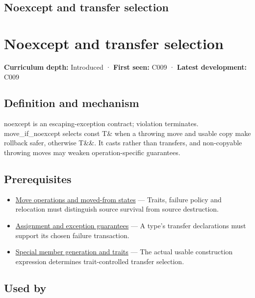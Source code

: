\hypertarget{appendix-c746afaa47d1}{}
\section*{Noexcept and transfer selection}
\chapter{Noexcept and transfer selection}\label{appendix-c746afaa47d1-noexcept-and-transfer-selection}

\textbf{Curriculum depth:} Introduced · \textbf{First seen:} C009 · \textbf{Latest development:} C009

\section{Definition and mechanism}\label{appendix-c746afaa47d1-definition-and-mechanism}

noexcept is an escaping-exception contract; violation terminates. move\_if\_noexcept selects const T\& when a throwing move and usable copy make rollback safer, otherwise T\&\&. It casts rather than transfers, and non-copyable throwing moves may weaken operation-specific guarantees.

\section{Prerequisites}\label{appendix-c746afaa47d1-prerequisites}

\begin{itemize}
\tightlist
\item
  \hyperref[appendix-5636651017c2]{Move operations and moved-from states} --- Traits, failure policy and relocation must distinguish source survival from source destruction.
\item
  \hyperref[appendix-bea6beb5350f]{Assignment and exception guarantees} --- A type's transfer declarations must support its chosen failure transaction.
\item
  \hyperref[appendix-42e02a12c694]{Special member generation and traits} --- The actual usable construction expression determines trait-controlled transfer selection.
\end{itemize}

\section{Used by}\label{appendix-c746afaa47d1-used-by}

